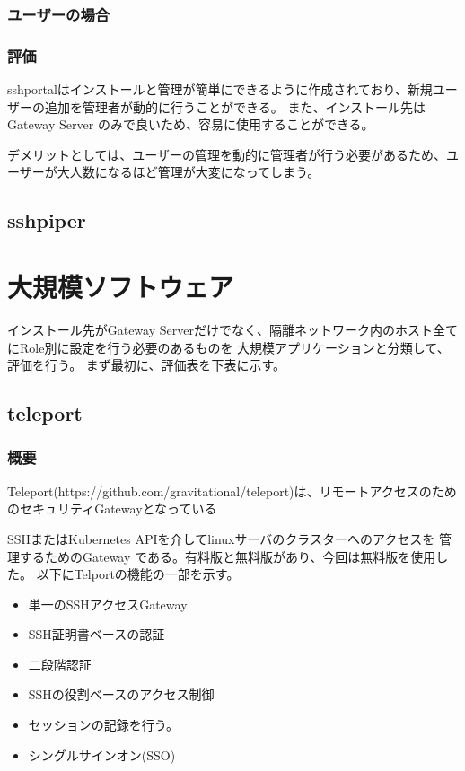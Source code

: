 \documentclass[12pt,a4paper,titlepage]{jsarticle}
\begin{document}
\subsubsection*{ユーザーの場合}


\subsubsection*{評価}
sshportalはインストールと管理が簡単にできるように作成されており、新規ユーザーの追加を管理者が動的に行うことができる。
また、インストール先はGateway Server のみで良いため、容易に使用することができる。
\par デメリットとしては、ユーザーの管理を動的に管理者が行う必要があるため、ユーザーが大人数になるほど管理が大変になってしまう。


\subsection{sshpiper}




\section{大規模ソフトウェア}
インストール先がGateway Serverだけでなく、隔離ネットワーク内のホスト全てにRole別に設定を行う必要のあるものを
大規模アプリケーションと分類して、評価を行う。
まず最初に、評価表を下表に示す。


\subsection{teleport}

\subsubsection*{概要}
Teleport(https://github.com/gravitational/teleport)は、リモートアクセスのためのセキュリティGatewayとなっている


SSHまたはKubernetes APIを介してlinuxサーバのクラスターへのアクセスを
管理するためのGateway である。有料版と無料版があり、今回は無料版を使用した。
以下にTelportの機能の一部を示す。

\begin{itemize}
    \item 単一のSSHアクセスGateway
    \item SSH証明書ベースの認証
    \item 二段階認証
    \item SSHの役割ベースのアクセス制御
    \item セッションの記録を行う。
    \item シングルサインオン(SSO)
\end{itemize}
\end{document}
